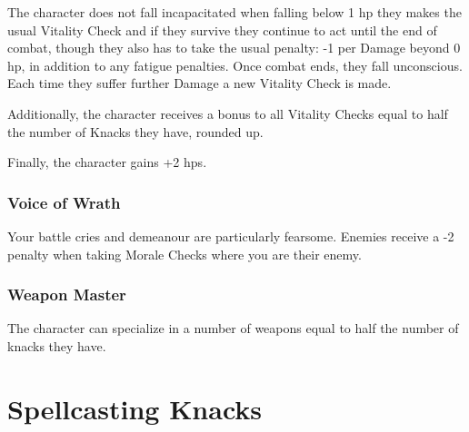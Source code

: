 \begin{multicols}{2}
The character does not fall incapacitated when falling below 1 \gls{hp} they makes the usual Vitality Check and if they survive they continue to act until the end of combat, though they also has to take the usual penalty: -1 per Damage beyond 0 \gls{hp}, in addition to any \gls{fatigue} penalties.
Once combat ends, they fall unconscious.
Each time they suffer further Damage a new Vitality Check is made.

Additionally, the character receives a bonus to all Vitality Checks equal to half the number of Knacks they have, rounded up.

Finally, the character gains +2 \glspl{hp}.

\subsubsection{Voice of Wrath}

Your battle cries and demeanour are particularly fearsome. Enemies receive a -2 penalty when taking Morale Checks where you are their enemy.

\subsubsection{Weapon Master}

\iftoggle{verbose}{
	The character has trained long and hard with a particular weapon, such as a longsword, spear, shortbow, or rocks.
	
}{
	Gain +1 to the Combat score when using a specialized weapon.
}%
	The character can specialize in a number of weapons equal to half the number of knacks they have.

\end{multicols}

\section{Spellcasting Knacks}


